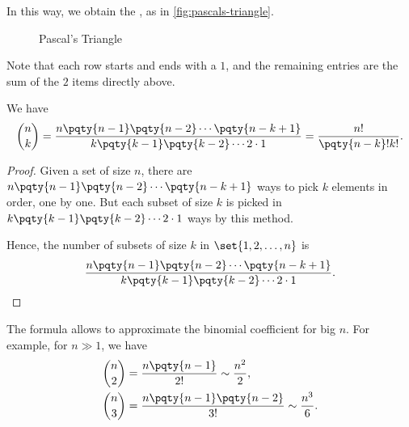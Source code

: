 In this way, we obtain the , as in \autoref{fig:pascals-triangle}.

\begin{figure}[ht!]
    \centering
    \caption{Pascal's Triangle}
    \label{fig:pascals-triangle}
\end{figure}

Note that each row starts and ends with a \(1\), and the remaining entries are the sum of the \(2\) items directly above.

\begin{proposition}
    We have
    \[
        \binom{n}{k} = \frac{n \pqty{n - 1} \pqty{n - 2} \cdots \pqty{n - k + 1}}{k \pqty{k - 1} \pqty{k - 2} \cdots 2 \cdot 1} = \frac{n!}{\pqty{n - k}! k!}.
    \]
\end{proposition}

\begin{proof}
    Given a set of size \(n\), there are \(n \pqty{n - 1} \pqty{n - 2} \cdots \pqty{n - k + 1}\) ways to pick \(k\) elements in order, one by one. But each subset of size \(k\) is picked in \(k \pqty{k - 1} \pqty{k - 2} \cdots 2 \cdot 1\) ways by this method.

    Hence, the number of subsets of size \(k\) in \(\set{1, 2, \ldots, n}\) is
    \[
        \frac{n \pqty{n - 1} \pqty{n - 2} \cdots \pqty{n - k + 1}}{k \pqty{k - 1} \pqty{k - 2} \cdots 2 \cdot 1}.
    \]
\end{proof}

The formula allows to approximate the binomial coefficient for big \(n\). For example, for \(n \gg 1\), we have
\begin{align*}
    \binom{n}{2} &= \frac{n \pqty{n - 1}}{2!} \sim \frac{n^2}{2}, \\
    \binom{n}{3} &= \frac{n \pqty{n - 1} \pqty{n - 2}}{3!} \sim \frac{n^3}{6}.
\end{align*}

